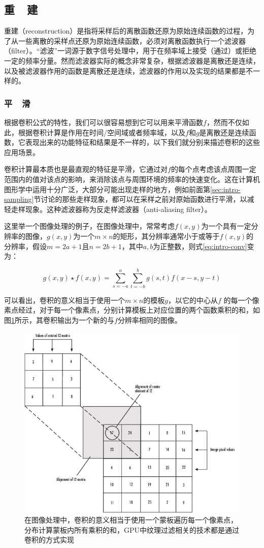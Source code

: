 \subsection{重~~建}\label{sec:intro-reconstruction}
重建（reconstruction）是指将采样后的离散函数还原为原始连续函数的过程，为了从一些离散的采样点还原为原始连续函数，必须对离散函数执行一个滤波器（filter）。“滤波”一词源于数字信号处理中，用于在频率域上接受（通过）或拒绝一定的频率分量。然而滤波器实际的概念非常复杂，根据滤波器是离散还是连续，以及被滤波器作用的函数是离散还是连续，滤波器的作用以及实现的结果都是不一样的。




\subsubsection{平~~滑}
根据卷积公式的特性，我们可以很容易想到它可以用来平滑函数$f$，然而不仅如此，根据卷积计算是作用在时间/空间域或者频率域，以及$f$和$g$是离散还是连续函数，它表现出来的功能特征和结果是不一样的，以下我们就分别来描述卷积的这些应用场景。

卷积计算最本质也是最直观的特征是平滑，它通过对$f$的每个点考虑该点周围一定范围内的值对该点的影响，来消除该点与周围环境的频率的快速变化。这在计算机图形学中运用十分广泛，大部分可能出现走样的地方，例如前面第\ref{sec:intro-sampling}节讨论的那些走样现象，都可以在采样之前对原始函数进行平滑，以减轻走样现象。这种滤波器称为反走样滤波器（anti-aliasing filter）。

这里举一个图像处理的例子，在图像处理中，常常考虑$f(x,y)$为一个具有一定分辨率的图像，$g(x,y)$为一个$m\times n$的矩形，其分辨率通常小于或等于$f(x,y)$的分辨率，假设$m=2a+1$且$n=2b+1$，其中$a,b$为正整数，则式\ref{eq:intro-conv}变为：

\begin{equation}\label{eq:intro-convolution-2}
	g(x,y)\star f(x,y)=\sum^{a}_{s=-a}\sum^{b}_{t=-b}g(s,t)f(x-s,y-t)
\end{equation}

可以看出，卷积的意义相当于使用一个$m\times n$的模板$g$，以它的中心从$f$ 的每一个像素点经过，对于每一个像素点，分别计算模板上对应位置的两个函数乘积的和，如图\ref{f:intro-conv}所示，其卷积输出为一个新的与$f$分辨率相同的图像。

\begin{figure}
\sidecaption
	\includegraphics[width=.5\textwidth]{figures/intro/conv}
	\caption{在图像处理中，卷积的意义相当于使用一个蒙板遍历每一个像素点，分布计算蒙板内所有乘积的和，GPU中纹理过滤相关的技术都是通过卷积的方式实现}
	\label{f:intro-conv}
\end{figure}



